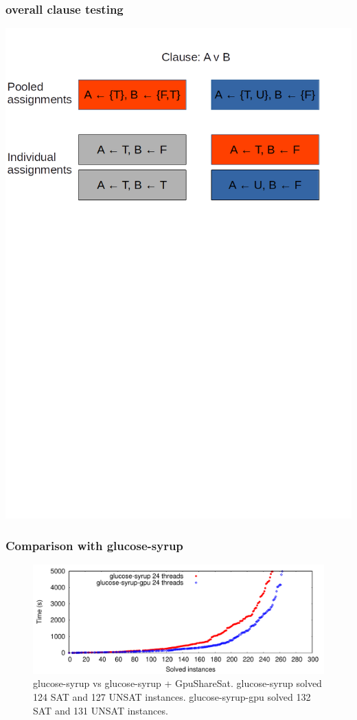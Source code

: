 \documentclass{beamer}
\begin{document}
\begin{frame}
\frametitle{overall clause testing}
\includegraphics[width=\textwidth]{clauseTest.png}
\end{frame}

\begin{frame}
\frametitle{Comparison with glucose-syrup}
\begin{figure}[h]
	\includegraphics[width=\textwidth]{cactusplot_syrup_vs_syrup_gpu}
	\caption{glucose-syrup vs glucose-syrup + GpuShareSat. glucose-syrup solved 124 SAT and 127 UNSAT instances. glucose-syrup-gpu solved 132 SAT and 131 UNSAT instances.  }
	\label{cactus:syrup}
\end{figure}
\end{frame}
\end{document}

